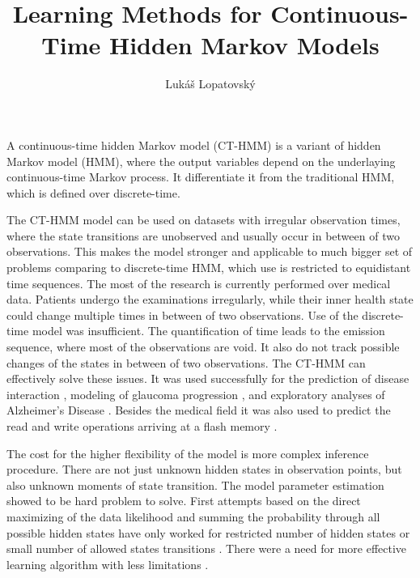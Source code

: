 \documentclass[thesis=M,english]{FITthesis}[2012/10/20]
\title{Learning Methods for Continuous-Time Hidden Markov Models}
\author{Luk{\' a}{\v s} Lopatovsk{\' y}} %
\begin{document}


\begin{introduction}

A continuous-time hidden Markov model (CT-HMM) is a variant of hidden Markov model (HMM), where the output variables depend on the underlaying continuous-time Markov process. It differentiate it from the traditional HMM, which is defined over discrete-time. 

The CT-HMM model can be used on datasets with irregular observation times, where the state transitions are unobserved and usually occur in between of two observations. This makes the model stronger and applicable to much bigger set of problems comparing to discrete-time HMM, which use is restricted to equidistant time sequences. The most of the research is currently performed over medical data. Patients undergo the examinations irregularly, while their inner health state could change multiple times in between of two observations. Use of the discrete-time model was insufficient. The quantification of time leads to the emission sequence, where most of the observations are void. It also do not track possible changes of the states in between of two observations. The CT-HMM can effectively solve these issues. It was used successfully for the prediction of disease interaction \cite{Le11}, modeling of glaucoma progression \cite{Li13, Li15}, and exploratory analyses of Alzheimer's Disease \cite{Li15}. Besides the medical field it was also used to predict the read and write operations arriving at a flash memory \cite{Zr10}.      

The cost for the higher flexibility of the model is more complex inference procedure. There are not just unknown hidden states in observation points, but also unknown moments of state transition. The model parameter estimation showed to be hard problem to solve. First attempts based on the direct maximizing of the data likelihood and summing the probability through all possible hidden states have only worked for restricted number of hidden states or small number of allowed states transitions \cite{Zr10,Ja11}. There were a need for more effective learning algorithm with less limitations \cite{Li13}.    


\end{introduction}
\end{document}

